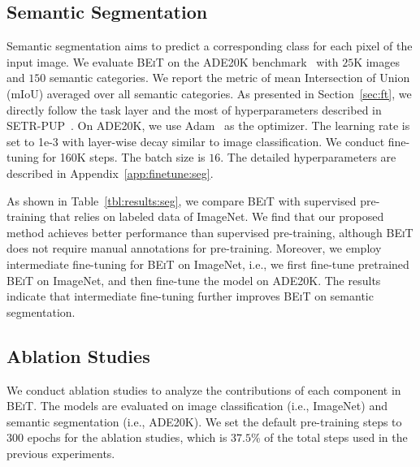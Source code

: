 \documentclass{article}
\newcommand\our{\textsc{BEiT}}
\begin{document}
\subsection{Semantic Segmentation}
\label{sec:results:seg}

Semantic segmentation aims to predict a corresponding class for each pixel of the input image.
We evaluate \our{} on the ADE20K benchmark~\citep{ade20k} with $25$K images and $150$ semantic categories.
We report the metric of mean Intersection of Union (mIoU) averaged over all semantic categories.
As presented in Section~\ref{sec:ft}, we directly follow the task layer and the most of hyperparameters described in SETR-PUP~\citep{setr}.
On ADE20K, we use Adam~\citep{adamw} as the optimizer. The learning rate is set to 1e-3 with layer-wise decay similar to image classification.
We conduct fine-tuning for 160K steps. The batch size is $16$.
The detailed hyperparameters are described in Appendix~\ref{app:finetune:seg}.

As shown in Table~\ref{tbl:results:seg}, we compare \our{} with supervised pre-training that relies on labeled data of ImageNet.
We find that our proposed method achieves better performance than supervised pre-training, although \our{} does not require manual annotations for pre-training.
Moreover, we employ intermediate fine-tuning for \our{} on ImageNet, i.e., we first fine-tune pretrained \our{} on ImageNet, and then fine-tune the model on ADE20K.
The results indicate that intermediate fine-tuning further improves \our{} on semantic segmentation.


\subsection{Ablation Studies}
\label{sec:ablation}

We conduct ablation studies to analyze the contributions of each component in \our{}.
The models are evaluated on image classification (i.e., ImageNet) and semantic segmentation (i.e., ADE20K).
We set the default pre-training steps to $300$ epochs for the ablation studies, which is $37.5$\% of the total steps used in the previous experiments.
\end{document}
